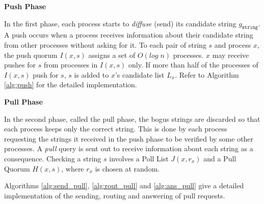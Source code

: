 

\textbf{Push Phase}

 In the first phase, each process starts to \textit{diffuse} (send) its candidate string $g_{\mathtt{string}}$. A push occurs when a process receives information about their candidate string from other processes without asking for it. To each pair of string $s$ and process $x$, the push quorum $I(x,s)$ assigns a set of $O(log\;n)$ processes. $x$ may receive pushes for $s$ from processes in $I(x,s)$ only. If more than half of the processes of $I(x,s)$ push for $s$, $s$ is added to $x$'s candidate list $L_x$. Refer to Algorithm \ref{alg:push} for the detailed implementation.








\textbf{Pull Phase}

In the second phase, called the pull phase, the bogus strings are discarded so that each process keeps only the correct string. This is done by each process requesting the strings it received in the push phase to be verified by some other processes. A \textit{pull} query is sent out to receive information about each string as a consequence. Checking a string $s$ involves a Poll List $J(x, r_x)$ and a Pull Quorum $H(x, s)$, where $r_x$ is chosen at random. 


Algorithms \ref{alg:send_pull}, \ref{alg:rout_pull} and \ref{alg:ans_pull} give a detailed implementation of the sending, routing and answering of pull requests.

